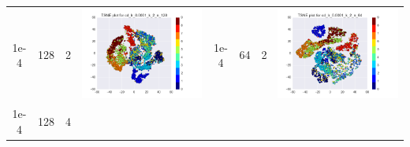 \documentclass[12pt]{report}
\begin{document}
\begin{table}[H]
\begin{tabular}{ | c | c | c | c || c | c | c| c |}
\begin{minipage}{.3\textwidth}
    \end{minipage}
    \\ \hline
    1e-4 & 128 & 2 &
    \begin{minipage}{.3\textwidth}
      \includegraphics[scale=0.25]{cd_lr_0_0001_k_2_n_128.png}
    \end{minipage}
	&
    1e-4 & 64 & 2 &
    \begin{minipage}{.3\textwidth}
      \includegraphics[scale=0.25]{cd_lr_0_0001_k_2_n_64.png}
    \end{minipage}
    \\ \hline
    1e-4 & 128 & 4 &
    \begin{minipage}{.3\textwidth}

\end{minipage}
\end{tabular}
\end{table}
\end{document}
